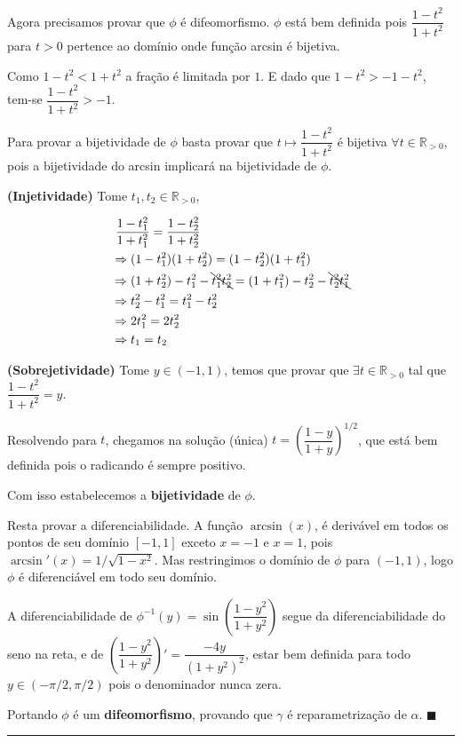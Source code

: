 \documentclass[12pt,letterpaper]{article}
\newcommand{\linesep}{{\color{black} \rule{\linewidth}{0.5mm} }}
\newcommand{\rpos}{\mathbb{R}_{>0}}
\begin{document}
\begin{enumerate}
	Agora precisamos provar que $\phi$ é difeomorfismo. $\phi$ está bem definida pois $\dfrac{1-t^2}{1+t^2}$ para $t>0$ pertence ao domínio onde função arcsin é bijetiva.
	
	Como $1-t^2<1+t^2$ a fração é limitada por $1$. E dado que $1-t^2>-1-t^2$, tem-se $\dfrac{1-t^2}{1+t^2}>-1$.
	
	Para provar a bijetividade de $\phi$ basta provar que $t\mapsto\dfrac{1-t^2}{1+t^2}$ é bijetiva $\forall t \in\rpos$, pois a bijetividade do arcsin implicará na bijetividade de $\phi$.
	
	\textbf{(Injetividade)} Tome $t_1,t_2\in\rpos$,
	
	\begin{align*}
		&~\dfrac{1-t_1^2}{1+t_1^2}=\dfrac{1-t_2^2}{1+t_2^2}\\
		&\Rightarrow (1-t_1^2)(1+t_2^2)=(1-t_2^2)(1+t_1^2)\\
		&\Rightarrow (1+t_2^2)-t_1^2-\bcancel{t_1^2t_2^2}=(1+t_1^2)-t_2^2-\bcancel{t_2^2t_1^2}\\
		&\Rightarrow t_2^2-t_1^2=t_1^2-t_2^2\\
		&\Rightarrow2t_1^2=2t_2^2\\
		&\Rightarrow t_1=t_2
	\end{align*} 

	\textbf{(Sobrejetividade)} Tome $y\in(-1,1)$, temos que provar que $\exists t\in\rpos$ tal que $\dfrac{1-t^2}{1+t^2}=y$.
	
	Resolvendo para $t$, chegamos na solução (única) $t=\left(\dfrac{1-y}{1+y}\right)^{1/2}$, que está bem definida pois o radicando é sempre positivo.
	
	Com isso estabelecemos a \textbf{bijetividade} de $\phi$.
	
	Resta provar a diferenciabilidade. A função $\arcsin(x)$, é derivável em todos os pontos de seu domínio $[-1,1]$ exceto $x=-1$ e $x=1$, pois $\arcsin'(x)=1/\sqrt{1 - x^2}$. Mas restringimos o domínio de $\phi$ para $(-1,1)$, logo $\phi$ é diferenciável em todo seu domínio. 
	
	A diferenciabilidade de $\phi^{-1}(y)=\sin\left(\dfrac{1-y^2}{1+y^2}\right)$ segue da diferenciabilidade do seno na reta, e de $\left(\dfrac{1-y^2}{1+y^2}\right)'=\dfrac{-4y}{(1+y^2)^2}$, estar bem definida para todo $y\in(-\pi/2,\pi/2)$ pois o denominador nunca zera.
	
	Portando $\phi$ é um \textbf{difeomorfismo}, provando que $\gamma$ é reparametrização de $\alpha$. $\blacksquare$
	
	\linesep
		

\end{enumerate}
\end{document}
